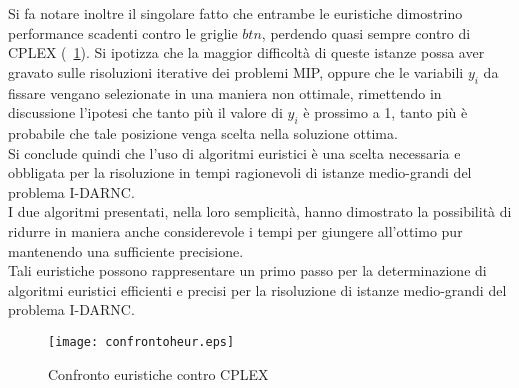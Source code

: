 %
Si fa notare inoltre il singolare fatto che entrambe le euristiche dimostrino performance scadenti contro le griglie $btn$, perdendo quasi sempre contro di CPLEX (\figurename\ \ref{fig:confeur}). Si ipotizza che la maggior difficoltà di queste istanze possa aver gravato sulle risoluzioni iterative dei problemi MIP, oppure che le variabili $y_i$ da fissare vengano selezionate in una maniera non ottimale, rimettendo in discussione l'ipotesi che tanto più il valore di $y_i$ è prossimo a 1, tanto più è probabile che tale posizione venga scelta nella soluzione ottima. \\
Si conclude quindi che l'uso di algoritmi euristici è una scelta necessaria e obbligata per la risoluzione in tempi ragionevoli di istanze medio-grandi del problema I-DARNC. \\
I due algoritmi presentati, nella loro semplicità, hanno dimostrato la possibilità di ridurre in maniera anche considerevole i tempi per giungere all'ottimo pur mantenendo una sufficiente precisione. \\
Tali euristiche possono rappresentare un primo passo per la determinazione di algoritmi euristici efficienti e precisi per la risoluzione di istanze medio-grandi del problema I-DARNC.
%
\begin{figure}
	\begin{center}
		\texttt{[image: confrontoheur.eps]}
	\end{center}
	\caption{Confronto euristiche contro CPLEX} \label{fig:confeur}
\end{figure}
%

